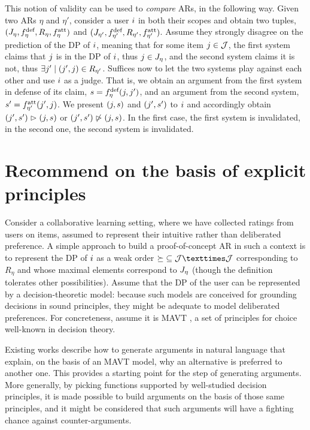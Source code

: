 \documentclass[french, english]{da2pl2018}
\begin{document}
This notion of validity can be used to \emph{compare} \acp{AR}, in the following way. Given two \acp{AR} $\eta$ and $\eta'$, consider a user $\usr$ in both their scopes and obtain two tuples, $(\mitems, \mdef, R_\eta, \matt)$ and $(\mitems[\eta'], \mdef[\eta'], R_{\eta'}, \matt[\eta'])$. Assume they strongly disagree on the prediction of the \ac{DP} of $\usr$, meaning that for some item $\itm \in \allitems$, the first system claims that $\itm$ is in the \ac{DP} of $\usr$, thus $\itm \in \mitems$, and the second system claims it is not, thus $\exists \itm' \suchthat (\itm', \itm) \in R_{\eta'}$. Suffices now to let the two systems play against each other and use $\usr$ as a judge. That is, we obtain an argument from the first system in defense of its claim, $\ar = \mdef(\itm, \itm')$, and an argument from the second system, $\ar' = \matt[\eta'](\itm', \itm)$. We present $(\itm, \ar)$ and $(\itm', \ar')$ to $\usr$ and accordingly obtain $(\itm', \ar') \ibeats (\itm, \ar)$ or $(\itm', \ar') \nibeats (\itm, \ar)$. In the first case, the first system is invalidated, in the second one, the second system is invalidated.

\section{Recommend on the basis of explicit principles}
\label{sec:princ}
Consider a collaborative learning setting, where we have collected ratings from users on items, assumed to represent their intuitive rather than deliberated preference. 
A simple approach to build a proof-of-concept \ac{AR} in such a context is to represent the \ac{DP} of $\usr$ as a weak order ${\succeq} \subseteq \allitems × \allitems$ corresponding to $R_\eta$ and whose maximal elements correspond to $\mitems$ (though the definition tolerates other possibilities).
Assume that the \ac{DP} of the user can be represented by a decision-theoretic model: because such models are conceived for grounding decisions in sound principles, they might be adequate to model deliberated preferences. %
For concreteness, assume it is \ac{MAVT} \citep{keeney_decisions_1993}, a set of principles for choice well-known in decision theory.

Existing works \citep{carenini_generating_2006, labreuche_general_2011} describe how to generate arguments in natural language that explain, on the basis of an \ac{MAVT} model, why an alternative is preferred to another one. This provides a starting point for the step of generating arguments.
More generally, by picking functions supported by well-studied decision principles, it is made possible to build arguments on the basis of those same principles, and it might be considered that such arguments will have a fighting chance against counter-arguments.
\end{document}
